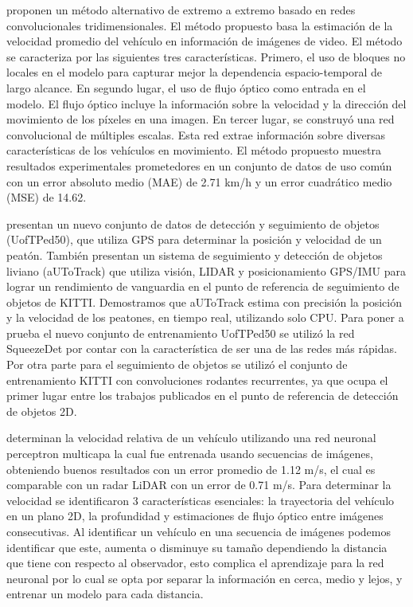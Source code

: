 \citeauthor{dong2019Vehicle} proponen un método alternativo de extremo a extremo basado en redes convolucionales tridimensionales. El método propuesto basa la estimación de la velocidad promedio del vehículo en información de imágenes de video. El método se caracteriza por las siguientes tres características. Primero, el uso de bloques no locales en el modelo para capturar mejor la dependencia espacio-temporal de largo alcance. En segundo lugar, el uso de flujo óptico como entrada en el modelo. El flujo óptico incluye la información sobre la velocidad y la dirección del movimiento de los píxeles en una imagen. En tercer lugar, se construyó una red convolucional de múltiples escalas. Esta red extrae información sobre diversas características de los vehículos en movimiento. El método propuesto muestra resultados experimentales prometedores en un conjunto de datos de uso común con un error absoluto medio (MAE) de 2.71 km/h y un error cuadrático medio (MSE) de 14.62.


\citeauthor{burnett2020aUToTrack} presentan un nuevo conjunto de datos de detección y seguimiento de objetos (UofTPed50), que utiliza GPS para determinar la posición y velocidad de un peatón. También presentan un sistema de seguimiento y detección de objetos liviano (aUToTrack) que utiliza visión, LIDAR y posicionamiento GPS/IMU para lograr un rendimiento de vanguardia en el punto de referencia de seguimiento de objetos de KITTI. Demostramos que aUToTrack estima con precisión la posición y la velocidad de los peatones, en tiempo real, utilizando solo CPU. Para poner a prueba el nuevo conjunto de entrenamiento UofTPed50 se utilizó la red SqueezeDet por contar con la característica de ser una de las redes más rápidas. Por otra parte para el seguimiento de objetos se utilizó el conjunto de entrenamiento KITTI con convoluciones rodantes recurrentes, ya que ocupa el primer lugar entre los trabajos publicados en el punto de referencia de detección de objetos 2D.


\citeauthor{kampelmuhler2018Camera} determinan la velocidad relativa de un vehículo utilizando una red neuronal perceptron multicapa la cual fue entrenada usando secuencias de imágenes, obteniendo buenos resultados con un error promedio de 1.12 m/s, el cual es comparable con un radar  LiDAR con un error de 0.71 m/s. Para determinar la velocidad se identificaron 3 características esenciales: la trayectoria del vehículo en un plano 2D, la profundidad y estimaciones de flujo óptico entre imágenes consecutivas. Al identificar un vehículo en una secuencia de imágenes podemos identificar que este, aumenta o disminuye su tamaño dependiendo la distancia que tiene con respecto al observador, esto complica el aprendizaje para la red neuronal por lo cual se opta por separar la información en cerca, medio y lejos, y entrenar un modelo para cada distancia.


